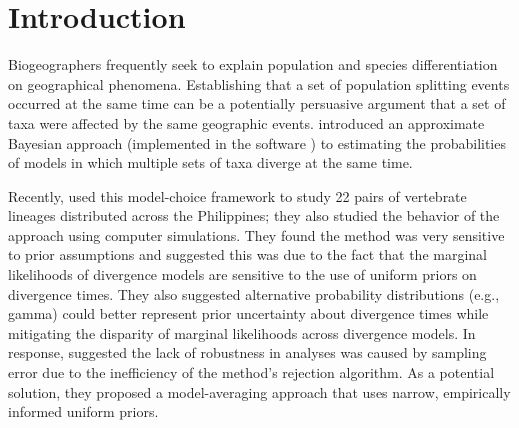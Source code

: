 \section{Introduction}
Biogeographers frequently seek to explain population and species
differentiation on geographical phenomena.
Establishing that a set of population splitting events occurred
at the same time can be a potentially persuasive argument that a set of taxa
were affected by the same geographic events.
\citet{Huang2011} introduced an approximate Bayesian approach (implemented in
the software \msb) to estimating the probabilities of models in which multiple
sets of taxa diverge at the same time. 

Recently, \citet{Oaks2012} used this model-choice framework to study 22 pairs
of vertebrate lineages distributed across the Philippines; they also studied
the behavior of the \msb approach using computer simulations.
They found the method was very sensitive to prior assumptions and suggested
this was due to the fact that the marginal likelihoods of divergence models are
sensitive to the use of uniform priors on divergence times.
They also suggested alternative probability distributions (e.g., gamma) could
better represent prior uncertainty about divergence times while mitigating the
disparity of marginal likelihoods across divergence models.
In response, \citet{Hickerson2013} suggested the lack of robustness in \msb
analyses was caused by sampling error due to the inefficiency of the method's
rejection algorithm.
As a potential solution, they proposed a model-averaging approach that uses
narrow, empirically informed uniform priors.

